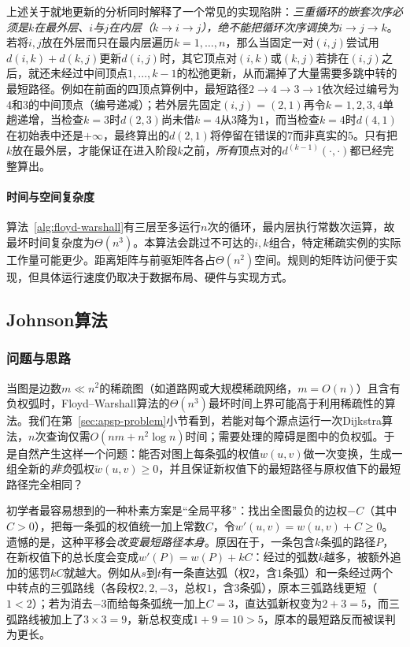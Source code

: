 上述关于就地更新的分析同时解释了一个常见的实现陷阱：\emph{三重循环的嵌套次序必须是$k$在最外层、$i$与$j$在内层（$k\to i\to j$），绝不能把循环次序调换为$i\to j\to k$}。若将$i,j$放在外层而只在最内层遍历$k=1,\ldots,n$，那么当固定一对$(i,j)$尝试用$d(i,k)+d(k,j)$更新$d(i,j)$时，其它顶点对$(i,k)$或$(k,j)$若排在$(i,j)$之后，就还未经过中间顶点$1,\ldots,k-1$的松弛更新，从而漏掉了大量需要多跳中转的最短路径。例如在前面的四顶点算例中，最短路径$2\to 4\to 3\to 1$依次经过编号为$4$和$3$的中间顶点（编号递减）；若外层先固定$(i,j)=(2,1)$再令$k=1,2,3,4$单趟递增，当检查$k=3$时$d(2,3)$尚未借$k=4$从$3$降为$1$，而当检查$k=4$时$d(4,1)$在初始表中还是$+\infty$，最终算出的$d(2,1)$将停留在错误的$7$而非真实的$5$。只有把$k$放在最外层，才能保证在进入阶段$k$之前，\emph{所有}顶点对的$d^{(k-1)}(\cdot,\cdot)$都已经完整算出。

\paragraph{时间与空间复杂度}
算法~\ref{alg:floyd-warshall}有三层至多运行$n$次的循环，最内层执行常数次运算，故最坏时间复杂度为$\Theta(n^3)$。本算法会跳过不可达的$i,k$组合，特定稀疏实例的实际工作量可能更少。距离矩阵与前驱矩阵各占$\Theta(n^2)$空间。规则的矩阵访问便于实现，但具体运行速度仍取决于数据布局、硬件与实现方式。

\subsection{Johnson算法}
\label{sec:johnson-algorithm}

\subsubsection{问题与思路}

当图是边数$m\ll n^2$的稀疏图（如道路网或大规模稀疏网络，$m=O(n)$）且含有负权弧时，Floyd--Warshall算法的$\Theta(n^3)$最坏时间上界可能高于利用稀疏性的算法。我们在第~\ref{sec:apsp-problem}小节看到，若能对每个源点运行一次Dijkstra算法，$n$次查询仅需$O(nm+n^2\log n)$时间；需要处理的障碍是图中的负权弧。于是自然产生这样一个问题：能否对图上每条弧的权值$w(u,v)$做一次变换，生成一组全新的\emph{非负}弧权$\tilde w(u,v)\geq0$，并且保证新权值下的最短路径与原权值下的最短路径完全相同？

初学者最容易想到的一种朴素方案是“全局平移”：找出全图最负的边权$-C$（其中$C>0$），把每一条弧的权值统一加上常数$C$，令$w'(u,v)=w(u,v)+C\geq0$。遗憾的是，这种平移会\emph{改变最短路径本身}。原因在于，一条包含$k$条弧的路径$P$，在新权值下的总长度会变成$w'(P)=w(P)+kC$：经过的弧数$k$越多，被额外追加的惩罚$kC$就越大。例如从$s$到$t$有一条直达弧（权$2$，含$1$条弧）和一条经过两个中转点的三弧路线（各段权$2,2,-3$，总权$1$，含$3$条弧），原本三弧路线更短（$1<2$）；若为消去$-3$而给每条弧统一加上$C=3$，直达弧新权变为$2+3=5$，而三弧路线被加上了$3\times3=9$，新总权变成$1+9=10>5$，原本的最短路反而被误判为更长。

